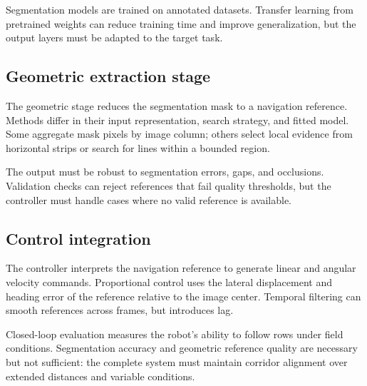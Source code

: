 Segmentation models are trained on annotated datasets. Transfer learning from pretrained weights can reduce training time and improve generalization, but the output layers must be adapted to the target task.

\subsection{Geometric extraction stage}
\label{subsec:geometric_stage}

The geometric stage reduces the segmentation mask to a navigation reference. Methods differ in their input representation, search strategy, and fitted model. Some aggregate mask pixels by image column; others select local evidence from horizontal strips or search for lines within a bounded region.

The output must be robust to segmentation errors, gaps, and occlusions. Validation checks can reject references that fail quality thresholds, but the controller must handle cases where no valid reference is available.

\subsection{Control integration}
\label{subsec:control_integration}

The controller interprets the navigation reference to generate linear and angular velocity commands. Proportional control uses the lateral displacement and heading error of the reference relative to the image center. Temporal filtering can smooth references across frames, but introduces lag.

Closed-loop evaluation measures the robot's ability to follow rows under field conditions. Segmentation accuracy and geometric reference quality are necessary but not sufficient: the complete system must maintain corridor alignment over extended distances and variable conditions.

